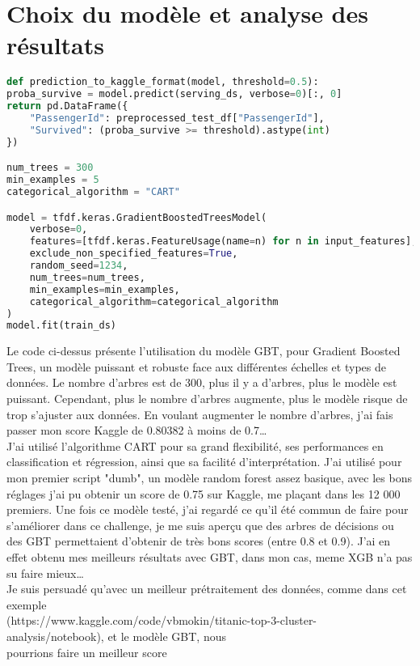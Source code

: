 \documentclass[9pt]{article}
\begin{document}
\section{\textcolor{section}{Choix du modèle et analyse des résultats}}
\begin{lstlisting}[language=Python, caption={Traitement des données}]
def prediction_to_kaggle_format(model, threshold=0.5):
proba_survive = model.predict(serving_ds, verbose=0)[:, 0]
return pd.DataFrame({
    "PassengerId": preprocessed_test_df["PassengerId"],
    "Survived": (proba_survive >= threshold).astype(int)
})

num_trees = 300
min_examples = 5
categorical_algorithm = "CART"

model = tfdf.keras.GradientBoostedTreesModel(
    verbose=0,
    features=[tfdf.keras.FeatureUsage(name=n) for n in input_features],
    exclude_non_specified_features=True,
    random_seed=1234,
    num_trees=num_trees,
    min_examples=min_examples,
    categorical_algorithm=categorical_algorithm
)
model.fit(train_ds)
\end{lstlisting}

\noindent Le code ci-dessus présente l'utilisation du modèle GBT, pour Gradient Boosted Trees, un modèle
puissant et robuste face aux différentes échelles et types de données. Le nombre d'arbres est de 300, plus il 
y a d'arbres, plus le modèle est puissant. Cependant, plus le nombre d'arbres  augmente, plus le modèle risque 
de trop s'ajuster aux données. En voulant augmenter le nombre d'arbres, j'ai fais passer mon score Kaggle de 0.80382
à moins de 0.7\dots \\
J'ai utilisé l'algorithme CART pour sa grand flexibilité, ses performances en classification et régression, ainsi que sa 
facilité d'interprétation. 
J'ai utilisé pour mon premier script "dumb", un modèle random forest assez basique, avec les bons réglages j'ai pu obtenir un score 
de 0.75 sur Kaggle, me plaçant dans les 12 000 premiers. Une fois ce modèle testé, j'ai regardé ce qu'il été commun de faire pour 
s'améliorer dans ce challenge, je me suis aperçu que des arbres de décisions ou des GBT permettaient d'obtenir de très bons scores
(entre 0.8 et 0.9). J'ai en effet obtenu mes meilleurs résultats avec GBT, dans mon cas, meme XGB n'a pas su faire mieux\dots \\
Je suis persuadé qu'avec un meilleur prétraitement des données, comme dans cet exemple \\
(https://www.kaggle.com/code/vbmokin/titanic-top-3-cluster-analysis/notebook), et le modèle GBT, nous\\ 
pourrions faire un meilleur score
\end{document}
